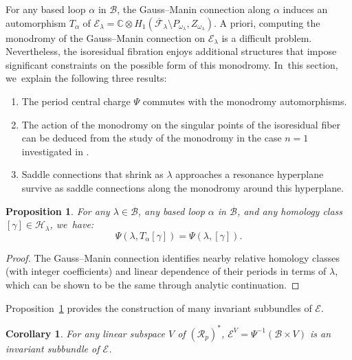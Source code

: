 \documentclass[JEP,XML,SOM,Unicode,NoFloatCountersInSection,published]{cedram}
\newcommand\calH{{\mathcal H}}
\newtheorem{cor}[thm]{Corollary}
\newtheorem{prop}[thm]{Proposition}
\theoremstyle{definition}
\begin{document}
For any based loop $\alpha$ in $\mathcal{B}$, the Gauss--Manin connection along $\alpha$ induces an automorphism
$T_{\alpha}$ of $\mathcal{E}_{\lambda} =\mathbb{C} \otimes
H_{1}(\overline{\mathcal{F}}_{\lambda} \setminus P_{\omega_{\lambda}}, Z_{\omega_{\lambda}})$. A priori, computing the monodromy of the Gauss--Manin connection on $\mathcal{E}_\lambda$ is a difficult problem. Nevertheless, the isoresidual fibration enjoys additional structures that impose significant constraints on the possible form of this monodromy. In~this section, we~explain the following three results:
\begin{enumerate}
\item The period central charge $\Psi$ commutes with the monodromy automorphisms.
\item The action of the monodromy on the singular points of the isoresidual fiber can be deduced from the study of the monodromy in the case $n=1$ investigated in \cite[\S 5]{GeTaIso}.
\item Saddle connections that shrink as $\lambda$ approaches a resonance hyperplane survive as saddle connections along the monodromy around this hyperplane.
\end{enumerate}

\label{subsub:commute}

\begin{prop}\label{prop:CommuteWithMonodromy}
For any $\lambda \in \mathcal{B}$, any based loop $\alpha$ in $\mathcal{B}$, and any homology class $[\gamma] \in \calH_{\lambda}$, we~have:
\[
\Psi(\lambda,T_{\alpha}[\gamma]) = \Psi(\lambda,[\gamma]).
\]
\end{prop}

\begin{proof}
The Gauss--Manin connection identifies nearby relative homology classes (with integer coefficients) and linear dependence of their periods in terms of $\lambda$, which can be shown to be the same through analytic continuation.
\end{proof}

Proposition~\ref{prop:CommuteWithMonodromy} provides the construction of many invariant subbundles of $\mathcal{E}$.

\begin{cor}\label{cor:InvariantSubbundle}
For any linear subspace $V$ of $(\mathcal{R}_{p})^{\ast}$, $\mathcal{E}^{V}=\Psi^{-1}(\mathcal{B} \times V)$ is an invariant subbundle of $\mathcal{E}$.
\end{cor}
\end{document}
